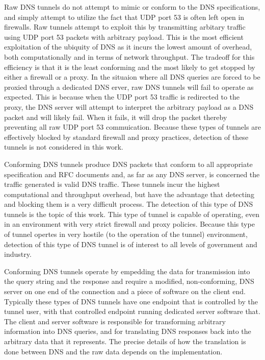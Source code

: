\documentclass{article}
\theoremstyle{remark}
\theoremstyle{definition}
\theoremstyle{definition}
\theoremstyle{definition}
\begin{document}
Raw DNS tunnels do not attempt to mimic or conform to the DNS
specifications, and simply attempt to utilize the fact that UDP port 53 is
often left open in firewalls. Raw tunnels attempt to exploit this by
transmitting arbitary traffic using UDP port 53 packets with arbitrary payload.
This is the most efficient exploitation of the ubiquity of DNS as it incurs the
lowest amount of overhead, both computationally and in terms of network
throughput. The tradeoff for this efficiency is that it is the least
conforming and the most likely to get stopped by either a firewall or a proxy.
In the situaion where all DNS queries are forced to be proxied through a
dedicated DNS erver, raw DNS tunnels will fail to operate as expected. This is
because when the UDP port 53 traffic is redirected to the proxy, the DNS server
will attempt to interpret the arbitrary payload as a DNS packet and will likely
fail. When it fails, it will drop the packet thereby preventing all raw UDP
port 53 commuication. Because these types of tunnels are effectively blocked by
standard firewall and proxy practices, detection of these tunnels is not
considered in this work.

Conforming DNS tunnels produce DNS packets that conform to all appropriate
specification and RFC documents and, as far as any DNS server, is concerned the
traffic generated is valid DNS traffic. These tunnels incur the highest
computational and throughput overhead, but have the advantage that detecting
and blocking them is a very difficult process. The detection of this type of
DNS tunnels is the topic of this work. This type of tunnel is capable of
operating, even in an environment with very strict firewall and proxy policies.
Because this type of tunnel opertes in very hostile (to the operation of the
tunnel) environment, detection of this type of DNS tunnel is of interest to all
levels of government and industry.

Conforming DNS tunnels operate by empedding the data for transmission into the
query string and the response and require a modified, non-conforming, DNS
server on one end of the connection and a piece of software on the client end.
Typically these types of DNS tunnels have one endpoint that is controlled by the
tunnel user, with that controlled endpoint running dedicated server software
that. The client and server software is responsible for transforming arbitrary
information into DNS queries, and for translating DNS responses back into the
arbitrary data that it represents. The precise details of how the translation
is done between DNS and the raw data depends on the implementation.
\end{document}
